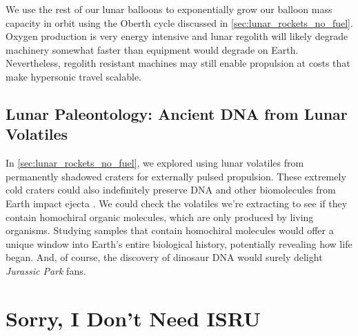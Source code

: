 \documentclass{article}
\begin{document}
{We use the rest of our lunar balloons to exponentially grow our balloon mass capacity in orbit using the Oberth cycle discussed in \autoref{sec:lunar_rockets_no_fuel}.  Oxygen production is very energy intensive and lunar regolith will likely degrade machinery somewhat faster than equipment would degrade on Earth.  Nevertheless, regolith resistant machines  may still enable propulsion at costs that make hypersonic travel scalable.

\subsection{Lunar Paleontology: Ancient DNA from Lunar Volatiles}\label{sec:jurassic_dark}
In \autoref{sec:lunar_rockets_no_fuel}, we explored using lunar volatiles from permanently shadowed craters for externally pulsed propulsion. These extremely cold craters could also indefinitely preserve DNA and other biomolecules from Earth impact ejecta \cite{dino_dna}. We could check the volatiles we're extracting to see if they contain homochiral organic molecules, which are only produced by living organisms.   Studying samples that contain homochiral molecules would offer a unique window into Earth's entire biological history, potentially revealing how life began. And, of course, the discovery of dinosaur DNA would surely delight \textit{Jurassic Park} \cite{jurassic_park} fans.

\section{Sorry, I Don't Need ISRU}
}
\end{document}
